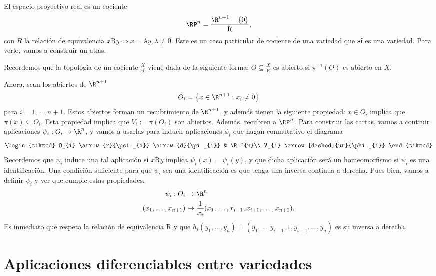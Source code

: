 \begin{ejemplo} \label{ejemplo:proyectivo}
  El espacio proyectivo real es un cociente
  \[
    \RP^{n} = \frac{\R^{n+1}-\{0\}}{\mathrm{R}}
  ,\]
con $R$ la relación de equivalencia $x\mathrm{R}y \iff x=\lambda y, \lambda\ne
0$. Este es un caso particular de cociente de una variedad que \textbf{sí} es
una variedad. Para verlo, vamos a construir un atlas.

Recordemos que la topología de un cociente $\frac{X}{\mathrm{R}}$ viene dada
de la siguiente forma: $O\subseteq \frac{X}{\mathrm{R}}$ es abierto si
$\pi^{-1}(O)$ es abierto en $X$.

Ahora, sean los abiertos de $\R^{n+1}$
\[
  O_{i} = \left\{ x\in\R^{n+1} : x_{i} \ne 0 \right\}
\]
para $i=1,\dots,n+1$. Estos abiertos forman un recubrimiento de $\R^{n+1}$, y
además tienen la siguiente propiedad: $x\in O_{i}$ implica que $\pi(x)\subseteq
O_{i}$. Esta propiedad implica que $V_{i} := \pi(O_{i})$ son abiertos. Además,
recubren a $\RP^{n}$. Para construir las cartas, vamos a contruir
aplicaciones $\psi_{i}: O_{i}\to \R^{n}$, y vamos a usarlas para inducir
aplicaciones $\phi_{i}$ que hagan conmutativo el diagrama
\[
  \begin{tikzcd}
    O_{i} \arrow{r}{\psi_{i}} \arrow{d}{\pi_{i}} & \R^{n}\\
    V_{i} \arrow[dashed]{ur}{\phi_{i}}
  \end{tikzcd}
\]
Recordemos que $\psi_{i}$ induce una tal aplicación si $x\mathrm{R}y$ implica
$\psi_{i}(x) = \psi_{i}(y)$, y que dicha aplicación será un homeomorfismo si
$\psi_{i}$ es una identificación. Una condición suficiente para que $\psi_{i}$
sea una identificación es que tenga una inversa continua a derecha. Pues bien,
vamos a definir $\psi_{i}$ y ver que cumple estas propiedades.
\begin{alignat*}{2}
    \psi_{i}: O_{i} & \to \R^{n} \\
    (x_{1},\dots,x_{n+1}) & \mapsto \frac{1}{x_{i}}(x_{1},\dots,x_{i-1},x_{i+1},\dots,x_{n+1}).
\end{alignat*}
  Es inmediato que respeta la relación de equivalencia $\mathrm{R}$ y que
  $h_{i}(y_{1},\dots,y_{n}) = (y_{1},\dots,y_{i-1},1,y_{i+1},\dots,y_{n})$ es su
  inversa a derecha. 
\end{ejemplo}

\section{Aplicaciones diferenciables entre variedades}

